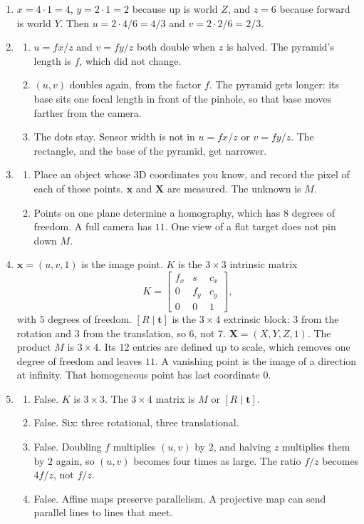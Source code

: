 \documentclass[11pt]{article}
\begin{document}
\begin{enumerate}
\item $x=4\cdot 1=4$, $y=2\cdot 1=2$ because $\mathrm{up}$ is world $Z$, and $z=6$ because $\mathrm{forward}$ is world $Y$. Then $u=2\cdot 4/6=4/3$ and $v=2\cdot 2/6=2/3$.

\item
\begin{enumerate}
\item $u=fx/z$ and $v=fy/z$ both double when $z$ is halved. The pyramid's length is $f$, which did not change.
\item $(u,v)$ doubles again, from the factor $f$. The pyramid gets longer: its base sits one focal length in front of the pinhole, so that base moves farther from the camera.
\item The dots stay. Sensor width is not in $u=fx/z$ or $v=fy/z$. The rectangle, and the base of the pyramid, get narrower.
\end{enumerate}

\item
\begin{enumerate}
\item Place an object whose 3D coordinates you know, and record the pixel of each of those points. $\mathbf{x}$ and $\mathbf{X}$ are measured. The unknown is $M$.
\item Points on one plane determine a homography, which has $8$ degrees of freedom. A full camera has $11$. One view of a flat target does not pin down $M$.
\end{enumerate}

\item $\mathbf{x}=(u,v,1)$ is the image point. $K$ is the $3\times 3$ intrinsic matrix
\[
K=\begin{bmatrix} f_x & s & c_x \\ 0 & f_y & c_y \\ 0 & 0 & 1 \end{bmatrix},
\]
with $5$ degrees of freedom. $[R\mid\mathbf{t}]$ is the $3\times 4$ extrinsic block: $3$ from the rotation and $3$ from the translation, so $6$, not $7$. $\mathbf{X}=(X,Y,Z,1)$. The product $M$ is $3\times 4$. Its $12$ entries are defined up to scale, which removes one degree of freedom and leaves $11$. A vanishing point is the image of a direction at infinity. That homogeneous point has last coordinate $0$.

\item
\begin{enumerate}
\item False. $K$ is $3\times 3$. The $3\times 4$ matrix is $M$ or $[R\mid\mathbf{t}]$.
\item False. Six: three rotational, three translational.
\item False. Doubling $f$ multiplies $(u,v)$ by $2$, and halving $z$ multiplies them by $2$ again, so $(u,v)$ becomes four times as large. The ratio $f/z$ becomes $4f/z$, not $f/z$.
\item False. Affine maps preserve parallelism. A projective map can send parallel lines to lines that meet.
\end{enumerate}


\end{enumerate}
\end{document}
